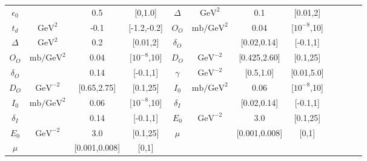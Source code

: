 \documentclass[11pt]{article}
\begin{document}
\begin{table}[htbp]
{\begin{tabular}{cccccccccccc}
				$\epsilon_0$ &  & 0.5 & [0,1.0] & $\Delta$ & $\textrm{GeV}^{2}$ & 0.1 & [0.01,2] &  &  &  & \\
				$t_d$ & $\textrm{GeV}^{2}$ & -0.1 & [-1.2,-0.2] & $O_O$ & $\text{mb}/\textrm{GeV}^{2}$ & 0.04 & [$10^{-8}$,10] &  &  &  & \\
				$\Delta$ & $\textrm{GeV}^{2}$ & 0.2 & [0.01,2] & $\delta_O$ & & [0.02,0.14] & [-0.1,1] &  &  &  &  \\
				$O_O$ & $\text{mb}/\textrm{GeV}^{2}$ & 0.04 & [$10^{-8}$,10] & $D_O$ & $\textrm{GeV}^{-2}$ & [0.425,2.60] & [0.1,25] &  &  &  &  \\
				$\delta_O$ &  & 0.14 & [-0.1,1] & $\gamma$ & $\textrm{GeV}^{-2}$ & [0.5,1.0] & [0.01,5.0] &  &  &  & \\
				$D_O$ & $\textrm{GeV}^{-2}$ &  [0.65,2.75] & [0.1,25] & $I_0$ & $\text{mb}/\textrm{GeV}^{2}$ & 0.06 & [$10^{-8}$,10] &  &  &  & \\
				$I_0$ & $\text{mb}/\textrm{GeV}^{2}$ & 0.06 & [$10^{-8}$,10] & $\delta_I$ &  & [0.02,0.14] & [-0.1,1] &  &  &  &  \\
				$\delta_I$ &  & 0.14 & [-0.1,1] & $E_0$ & $\textrm{GeV}^{-2}$ & 3.0 & [0.1,25] &  &  &  &  \\
				$E_0$ & $\textrm{GeV}^{-2}$ & 3.0 & [0.1,25] & $\mu$ & & [0.001,0.008] & [0,1] &  &  &  &    \\
				$\mu$ &  & [0.001,0.008] &  [0,1] &  &  &  &  &  &  &  &  \\
				\bottomrule
				\bottomrule
			\end{tabular}
}
\end{table}
\end{document}
